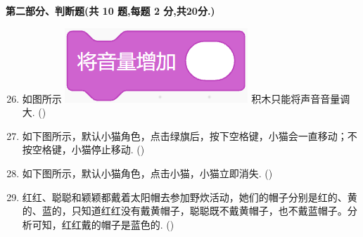 \documentclass[10pt, a4paper]{article}
\begin{document}
    {\noindent\textbf{第二部分、判断题(共 10 题,每题 2 分,共20分.)}}
    \begin{enumerate}
        \setcounter{enumi}{25}
        \item 如图所示 \includegraphics[width=.12\textwidth]{26.png} 积木只能将声音音量调大. (\qquad)

        \item 如下图所示，默认小猫角色，点击绿旗后，按下空格键，小猫会一直移动；不按空格键，小猫停止移动. (\qquad)

        \item 如下图所示，默认小猫角色，点击小猫，小猫立即消失. (\qquad)

        \item 红红、聪聪和颖颖都戴着太阳帽去参加野炊活动，她们的帽子分别是红的、黄的、蓝的，只知道红红没有戴黄帽子，聪聪既不戴黄帽子，也不戴蓝帽子。分析可知，红红戴的帽子是蓝色的. (\qquad)


\end{enumerate}
\end{document}
